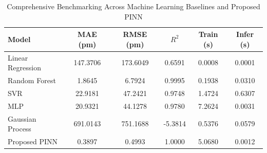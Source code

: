 \begin{table}[h]
\centering
\caption{Comprehensive Benchmarking Across Machine Learning Baselines and Proposed PINN}
\label{tab:baseline_comparison}
\begin{tabular}{lccccc}
\hline
\textbf{Model} & \textbf{MAE (pm)} & \textbf{RMSE (pm)} & \textbf{$R^2$} & \textbf{Train (s)} & \textbf{Infer (s)} \\ \hline
Linear Regression & 147.3706 & 173.6049 & 0.6591 & 0.0008 & 0.0001 \\
Random Forest & 1.8645 & 6.7924 & 0.9995 & 0.1938 & 0.0310 \\
SVR & 22.9181 & 47.2421 & 0.9748 & 1.4724 & 0.6307 \\
MLP & 20.9321 & 44.1278 & 0.9780 & 7.2624 & 0.0031 \\
Gaussian Process & 691.0143 & 751.1688 & -5.3814 & 0.5376 & 0.0579 \\
Proposed PINN & 0.3897 & 0.4993 & 1.0000 & 5.0680 & 0.0012 \\
\hline
\end{tabular}
\end{table}